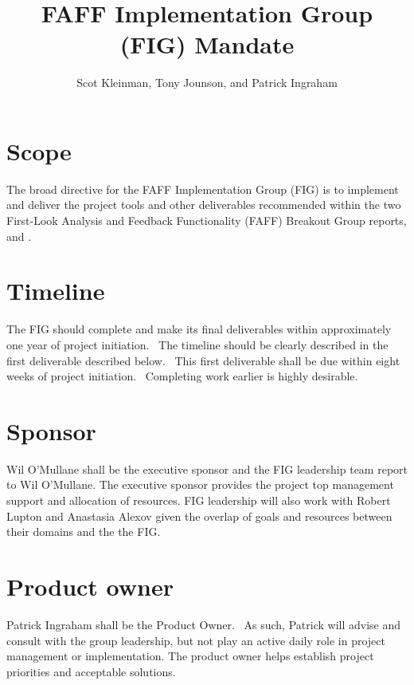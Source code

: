 \documentclass[SE,authoryear,lsstdraft]{lsstdoc}
\title{FAFF Implementation Group (FIG) Mandate}
\author{%
Scot Kleinman,
Tony Jounson,
and
Patrick Ingraham
}
\date{\vcsDate}
\begin{document}
\maketitle

\section{Scope}
The broad directive for the FAFF Implementation Group (FIG) is to
implement and deliver the project tools and other deliverables recommended
within the two First-Look Analysis and Feedback Functionality (FAFF)
Breakout Group reports,  and .

\section{Timeline}
The FIG should complete and make its final deliverables within
approximately one year of project initiation.  The timeline should be
clearly described in the first deliverable described below.  This first
deliverable shall be due within eight weeks of project initiation. 
Completing work earlier is highly desirable.


\section{Sponsor}
Wil O’Mullane shall be the executive sponsor and the FIG leadership
team report to Wil O’Mullane.  The executive sponsor provides the project top management support and allocation of resources.
FIG leadership will also work with Robert Lupton and
Anastasia Alexov given the overlap of goals and
resources between their domains and the the FIG.



\section{Product owner}
Patrick Ingraham shall be the Product Owner.  As such, Patrick will
advise and consult with the group leadership, but not play an active
daily role in project management or implementation.  The product owner
helps establish project priorities and acceptable solutions.
\end{document}
